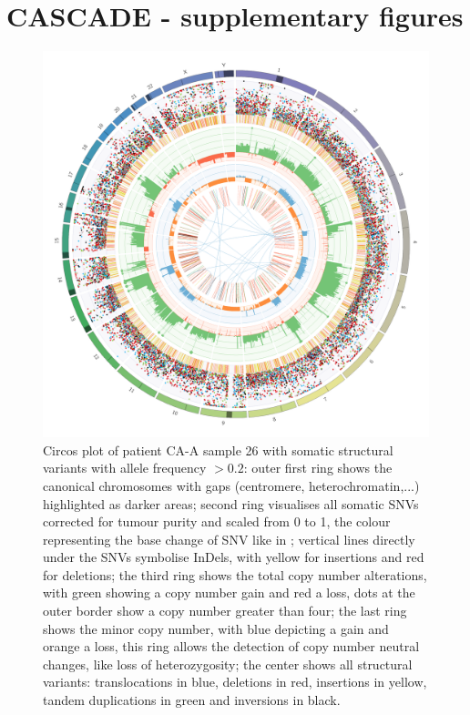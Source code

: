 \chapter*{CASCADE - supplementary figures}
\label{ch-cascadeSuppFig}

\begin{figure}[!ht]
\centering
\includegraphics[width=.99\linewidth]{Figures/CASCADE/CA99/CA99-26.circos.png}
\caption[Circos plot of patient CA-A sample 26]{Circos plot of patient CA-A sample 26 with somatic structural variants with allele frequency $> 0.2$: outer first ring shows the canonical chromosomes with gaps (centromere, heterochromatin,...) highlighted as darker areas; second ring visualises all somatic SNVs corrected for tumour purity and scaled from 0 to 1, the colour representing the base change of SNV like in \protect\textcite{Alexandrov2013}; vertical lines directly under the SNVs symbolise InDels, with yellow for insertions and red for deletions; the third ring shows the total copy number alterations, with green showing a copy number gain and red a loss, dots at the outer border show a copy number greater than four; the last ring shows the minor copy number, with blue depicting a gain and orange a loss, this ring allows the detection of copy number neutral changes, like loss of heterozygosity; the center shows all structural variants: translocations in blue, deletions in red, insertions in yellow, tandem duplications in green and inversions in black.} \label{fig:ca99.26circos}
\end{figure}


